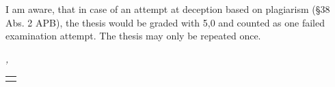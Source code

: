 I am aware, that in case of an attempt at deception based on plagiarism (§38 Abs. 2 APB), the thesis would be graded with 5,0 and counted as one failed examination attempt. The thesis may only be repeated once.

\vfill

\noindent\textit{\myLocation{}, \myTime{}}

\begin{flushright}
    \begin{tabular}{m{5cm}}
        \\ \hline
        \centering\myName{} \\
    \end{tabular}
\end{flushright}

\endgroup
